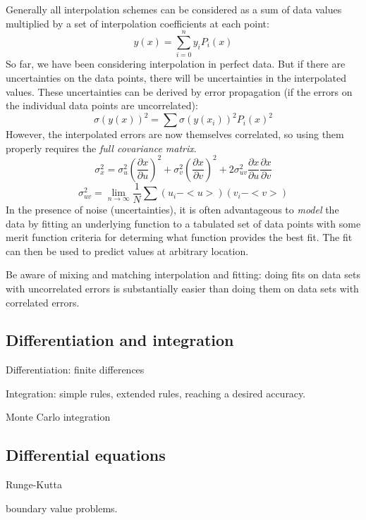 \documentclass{article}
\begin{document}
Generally all interpolation schemes can be considered as a sum of data
values multiplied by a set of interpolation coefficients at each
point:
$$ y(x) = \sum_{i=0}^{n} y_{i}P_{i}(x) $$
So far, we have been considering interpolation in perfect data.
But if there are uncertainties on the data points, there will be
uncertainties in the interpolated values.
These uncertainties can be derived by error propagation (if the errors on
the individual data points are uncorrelated):
$$ \sigma(y(x))^{2} = \sum\sigma(y(x_{i}))^{2}P_{i}(x)^{2} $$
However, the interpolated errors are now themselves correlated,
so using them
properly requires the \emph{full covariance matrix}.
$$ \sigma_{x}^{2}=\sigma_{u}^{2}\left(\frac{\partial{x}}{\partial{u}}\right)^{2} +
\sigma_{v}^{2}\left(\frac{\partial{x}}{\partial{v}}\right)^{2} +
2\sigma_{uv}^{2}\frac{\partial{x}}{\partial{u}}\frac{\partial{x}}{\partial{v}} $$
$$ \sigma_{uv}^{2} = \lim_{n\rightarrow\infty}\frac{1}{N}
\sum(u_{i}-<u>)(v_{i}-<v>)$$
In the presence of noise (uncertainties), it is often advantageous to
\emph{model} the data by fitting an underlying function to a tabulated set of
data points with some merit function criteria for determing what
function provides the best fit. The fit can then be used to predict
values at arbitrary location.

Be aware of mixing and matching interpolation and fitting: doing fits on
data sets with uncorrelated errors is substantially easier than doing
them on data sets with correlated errors.

\subsection{Differentiation and integration}
\begin{itemize*}
    \item Differentiation: finite differences
    \item Integration: simple
        rules, extended rules, reaching a desired accuracy.
    \item Monte Carlo integration
\end{itemize*}

\subsection{Differential equations}
\begin{itemize*}
    \item Runge-Kutta
    \item boundary value problems.
\end{itemize*}
\end{document}
